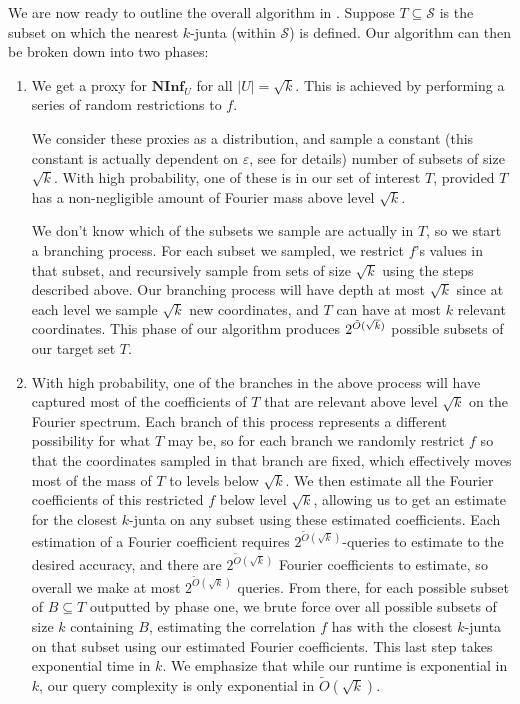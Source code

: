 \documentclass[10pt,a4paper]{article}
\theoremstyle{plain}
\theoremstyle{remark}
\theoremstyle{plain}
\newcommand\NormInf{{\mathbf{NInf}}}
\renewcommand{\tilde}{\widetilde}
\newcommand{\calS}{\mathcal{S}}
\newcommand{\InfluentialCoords}{\calS}
\newcommand{\specialset}{T}
\renewcommand{\epsilon}{\varepsilon}
\begin{document}
We are now ready to outline the overall algorithm in . Suppose $\specialset\subseteq \InfluentialCoords$ is the subset on which the nearest $k$-junta (within $\InfluentialCoords$) is defined. Our algorithm can then be broken down into two phases:
\begin{enumerate}
    \item[Phase 1.] We get a proxy for $\NormInf_U$ for all $|U| = \sqrt{k}$. This is achieved by performing a series of random restrictions to $f$.
    
    We consider these proxies as a distribution, and sample a constant (this constant is actually dependent on $\epsilon$, see  for details) number of subsets of size $\sqrt{k}$. With high probability, one of these is in our set of interest $\specialset$, provided $\specialset$ has a non-negligible amount of Fourier mass above level $\sqrt{k}$. 
    
     We don't know which of the subsets we sample are actually in $\specialset$, so we start a branching process. For each subset we sampled, we restrict $f$'s values in that subset, and recursively sample from sets of size $\sqrt{k}$ using the steps described above. Our branching process will have depth at most $\sqrt{k}$ since at each level we sample $\sqrt{k}$ new coordinates, and $\specialset$ can have at most $k$ relevant coordinates. This phase  of our algorithm produces $2^{\Tilde{O}(\sqrt{k})}$ possible subsets of our target set $\specialset$.
    \item[Phase 2.] With high probability, one of the branches in the above process will have captured most of the coefficients of $T$ that are relevant above level $\sqrt{k}$ on the Fourier spectrum. Each branch of this process represents a different possibility for what $\specialset$ may be, so for each branch we randomly restrict $f$ so that the coordinates sampled in that branch are fixed, which effectively moves most of the mass of $T$ to levels below $\sqrt{k}$. 
    We then estimate all the Fourier coefficients of this restricted $f$ below level $\sqrt{k}$, allowing us to get an estimate for the closest $k$-junta on any subset using these estimated coefficients. 
    Each estimation of a Fourier coefficient requires $2^{\tilde{O}(\sqrt{k})}$-queries to estimate to the desired accuracy, and there are $2^{\tilde{O}(\sqrt{k})}$ Fourier coefficients to estimate, so overall we make at most $2^{\tilde{O}(\sqrt{k})}$ queries. From there, for each possible subset of $B \subseteq \specialset$ outputted by phase one, we brute force over all possible subsets of size $k$ containing $B$, estimating the correlation $f$ has with the closest $k$-junta on that subset using our estimated Fourier coefficients. This last step takes exponential time in $k$. We emphasize that while our runtime is exponential in $k$, our query complexity is only exponential in $\tilde{O}(\sqrt{k})$.
%
\end{enumerate} 
\end{document}
